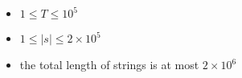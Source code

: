 \begin{itemize}
\tightlist
\item $1 \leq T \leq 10^5$
\item $1 \leq |s| \leq 2\times 10^5$
\item the total length of strings is at most $2 \times 10^6$
\end{itemize}
